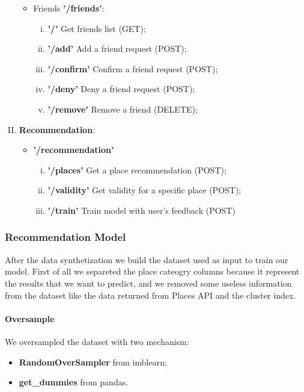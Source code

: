 \documentclass[../../main]{subfiles}
\begin{document}
\begin{enumerate}[I)]
\begin{itemize}
        \item Friends \textbf{'/friends'}:
        \begin{enumerate}[i)]
            \item \textbf{'/'} Get friends list (GET);
            \item \textbf{'/add'} Add a friend request (POST);
            \item \textbf{'/confirm'} Confirm a friend request (POST);
            \item \textbf{'/deny'} Deny a friend request (POST);
            \item \textbf{'/remove'} Remove a friend (DELETE);
        \end{enumerate}
    \end{itemize}
    \item \textbf{Recommendation}:
    \begin{itemize}
        \item \textbf{'/recommendation'}
        \begin{enumerate}[i)]
            \item \textbf{'/places'} Get a place recommendation (POST);
            \item \textbf{'/validity'} Get validity for a specific place (POST);
            \item \textbf{'/train'} Train model with user's feedback (POST)
        \end{enumerate}
    \end{itemize}
\end{enumerate}
    

    
\subsubsection{Recommendation Model}
After the data synthetization we build the dataset used as input to train our model. First of all we separeted the place cateogry columns because it represent the results that we want to predict, and we removed some useless information from the dataset like the data returned from Places API and the cluster index.
\paragraph*{Oversample}
We oversampled the dataset with two mechanism:
\begin{itemize}
    \item \textbf{RandomOverSampler} from imblearn;
    \item \textbf{get\_dummies} from pandas.
\end{itemize}
\end{document}
